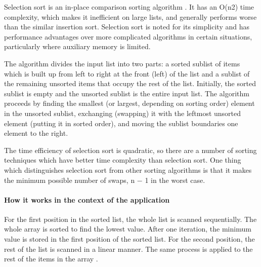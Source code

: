 Selection sort is an in-place comparison sorting algorithm \cite{selection_sort}. It has an O(n2) time complexity, which makes it inefficient on large lists, and generally performs worse than the similar insertion sort. Selection sort is noted for its simplicity and has performance advantages over more complicated algorithms in certain situations, particularly where auxiliary memory is limited.
\par
\bigskip
The algorithm divides the input list into two parts: a sorted sublist of items which is built up from left to right at the front (left) of the list and a sublist of the remaining unsorted items that occupy the rest of the list. Initially, the sorted sublist is empty and the unsorted sublist is the entire input list. The algorithm proceeds by finding the smallest (or largest, depending on sorting order) element in the unsorted sublist, exchanging (swapping) it with the leftmost unsorted element (putting it in sorted order), and moving the sublist boundaries one element to the right.
\par
\bigskip
The time efficiency of selection sort is quadratic, so there are a number of sorting techniques which have better time complexity than selection sort. One thing which distinguishes selection sort from other sorting algorithms is that it makes the minimum possible number of swaps, n − 1 in the worst case.

\paragraph{How it works in the context of the application}
For the first position in the sorted list, the whole list is scanned sequentially. The whole array is sorted to find the lowest value. After one iteration, the minimum value is stored in the first position of the sorted list. For the second position, the rest of the list is scanned in a linear manner. The same process is applied to the rest of the items in the array \cite{selection_sort_geeks}.

